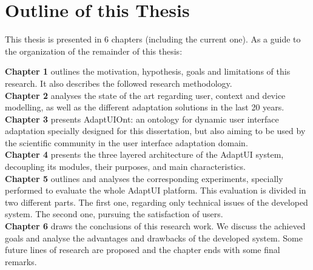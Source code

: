 
\section{Outline of this Thesis}
\label{sec:outline}

This thesis is presented in 6 chapters (including the current one). As a guide 
to the organization of the remainder of this thesis:

\hspace*{5mm} \textbf{Chapter 1} outlines the motivation, hypothesis, goals and 
limitations of this research. It also describes the followed research 
methodology. \\

\hspace*{5mm} \textbf{Chapter 2} analyses the state of the art regarding user, 
context and device modelling, as well as the different adaptation solutions in 
the last 20 years. \\

\hspace*{5mm} \textbf{Chapter 3} presents AdaptUIOnt: an ontology for 
dynamic user interface adaptation specially designed for this dissertation, 
but also aiming to be used by the scientific community in the user interface 
adaptation domain.\\

\hspace*{5mm} \textbf{Chapter 4} presents the three layered architecture of 
the AdaptUI system, decoupling its modules, their purposes, and main 
characteristics.\\

\hspace*{5mm} \textbf{Chapter 5} outlines and analyses the corresponding
experiments, specially performed to evaluate the whole AdaptUI platform. This
evaluation is divided in two different parts. The first one, regarding only
technical issues of the developed system. The second one, pursuing the 
satisfaction of users.\\

\hspace*{5mm} \textbf{Chapter 6} draws the conclusions of this research work. We 
discuss the achieved goals and analyse the advantages and drawbacks of the 
developed system. Some future lines of research are proposed and the chapter 
ends with some final remarks.\\


% 
